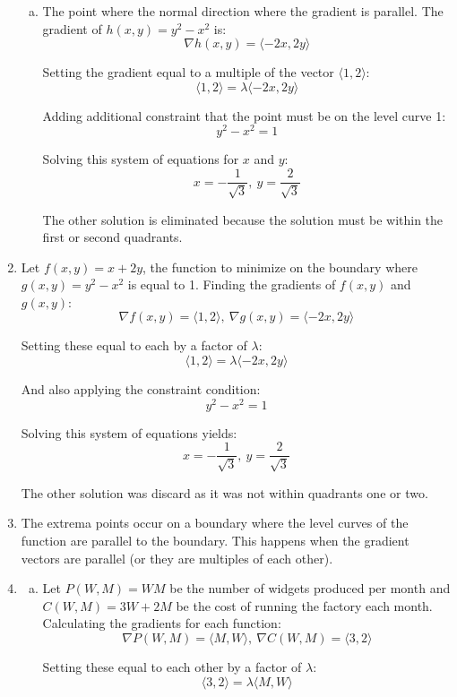 \documentclass{article}
\begin{document}
\begin{enumerate}[1.]
\begin{enumerate}[a.]
      \item The point where the normal direction where the gradient is parallel.
        The gradient of $h(x,y) = y^{2} - x^{2}$ is:
        $$ \nabla h(x, y) = \langle -2x, 2y \rangle $$

        Setting the gradient equal to a multiple of the vector $\langle 1, 2 \rangle$:
        $$ \langle 1, 2 \rangle = \lambda \langle -2x, 2y \rangle $$

        Adding additional constraint that the point must be on the level curve
        1:
        $$ y^{2} - x^{2} = 1 $$

        Solving this system of equations for $x$ and $y$:
        $$ x = -\frac{ 1 }{ \sqrt{3} },\ y = \frac{ 2 }{ \sqrt{3} } $$

        The other solution is eliminated because the solution must be within the
        first or second quadrants.
    \end{enumerate}
  \item Let $f(x, y) = x + 2y$, the function to minimize on the boundary where
    $g(x, y) = y^{2} - x^{2}$ is equal to 1. Finding the gradients of $f(x,y)$
    and $g(x, y)$:
    $$ \nabla f(x, y) = \langle 1, 2 \rangle,\ \nabla g(x, y) = \langle -2x, 2y
    \rangle $$

    Setting these equal to each by a factor of $\lambda$:
    $$ \langle 1, 2 \rangle = \lambda \langle -2x, 2y \rangle $$

    And also applying the constraint condition:
    $$ y^{2} - x^{2} = 1 $$

    Solving this system of equations yields:
    $$ x = -\frac{ 1 }{ \sqrt{3} },\ y = \frac{ 2 }{ \sqrt{3} } $$

    The other solution was discard as it was not within quadrants one or two.
  \item The extrema points occur on a boundary where the level curves of the
    function are parallel to the boundary. This happens when the gradient
    vectors are parallel (or they are multiples of each other).
  \item \begin{enumerate}[a.]
      \item Let $P(W, M) = WM$ be the number of widgets produced per month and
        $C(W, M) = 3W + 2M$ be the cost of running the factory each month.
        Calculating the gradients for each function:
        $$ \nabla P(W, M) = \langle M, W \rangle,\ \nabla C(W, M) = \langle 3, 2
        \rangle $$

        Setting these equal to each other by a factor of $\lambda$:
        $$ \langle 3, 2 \rangle = \lambda \langle M, W \rangle $$


\end{enumerate}
\end{enumerate}
\end{document}
